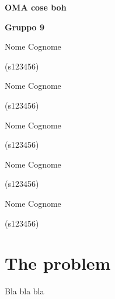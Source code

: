 \documentclass[11pt, a4paper, leqno]{article}
\newcommand{\nome}[2]{
\begin{minipage}[t]{0.18\linewidth}
	\centering #1\par
	\centering\small (#2)\par
\end{minipage}
}
\begin{document}
	
	\begin{center}
		{\huge\textbf{OMA cose boh}}\par
		\vspace{0.3em}
		{\large\textbf{Gruppo 9}}\par
		\vspace{1em}
		\nome{Nome Cognome}{s123456}
		\nome{Nome Cognome}{s123456}
		\nome{Nome Cognome}{s123456}
		\nome{Nome Cognome}{s123456}
		\nome{Nome Cognome}{s123456}
	\end{center}
	
	\section{The problem}
	
	Bla bla bla
	
\end{document}
